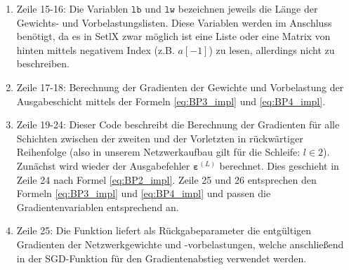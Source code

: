 \begin{enumerate}
\item Zeile 15-16: Die Variablen $\mathtt{lb}$ und $\mathtt{lw}$ bezeichnen jeweils die Länge der Gewichts- und Vorbelastungslisten. Diese Variablen werden im Anschluss benötigt, da es in SetlX zwar möglich ist eine Liste oder eine Matrix von hinten mittels negativem Index (z.B. $a[-1]$) zu lesen, allerdings nicht zu beschreiben.
\item Zeile 17-18: Berechnung der Gradienten der Gewichte und Vorbelastung der Ausgabeschicht mittels der Formeln \eqref{eq:BP3_impl} und \eqref{eq:BP4_impl}.
\item Zeile 19-24: Dieser Code beschreibt die Berechnung der Gradienten für alle Schichten zwischen der zweiten und der Vorletzten in rückwärtiger Reihenfolge (also in unserem Netzwerkaufbau gilt für die Schleife: $l \in {2}$). Zunächst wird wieder der Ausgabefehler $\boldsymbol{\varepsilon}^{(L)}$ berechnet. Dies geschieht in Zeile 24 nach Formel \eqref{eq:BP2_impl}. Zeile 25 und 26 entsprechen den Formeln \eqref{eq:BP3_impl} und \eqref{eq:BP4_impl} und passen die Gradientenvariablen entsprechend an.
\item Zeile 25: Die Funktion liefert als Rückgabeparameter die entgültigen Gradienten der Netzwerkgewichte und -vorbelastungen, welche anschließend in der SGD-Funktion für den Gradientenabstieg verwendet werden.
\end{enumerate}

